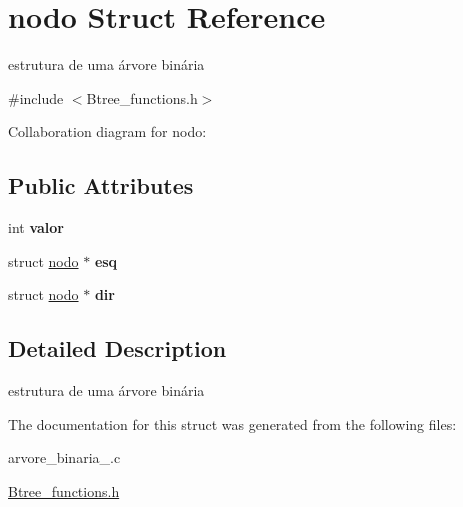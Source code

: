 \hypertarget{structnodo}{}\section{nodo Struct Reference}
\label{structnodo}


estrutura de uma árvore binária  




{\ttfamily \#include $<$Btree\+\_\+functions.\+h$>$}



Collaboration diagram for nodo\+:
\subsection*{Public Attributes}
\begin{DoxyCompactItemize}
\item 
\mbox{\label{structnodo_a40424c40ee6ffe6e5624f51ac42cbd20}} 
int {\bfseries valor}
\item 
\mbox{\label{structnodo_acd19927cd40acee84c58c2debeb234f8}} 
struct \hyperlink{structnodo}{nodo} $\ast$ {\bfseries esq}
\item 
\mbox{\label{structnodo_acb489ce2018caeddde0605244cffa200}} 
struct \hyperlink{structnodo}{nodo} $\ast$ {\bfseries dir}
\end{DoxyCompactItemize}


\subsection{Detailed Description}
estrutura de uma árvore binária 

The documentation for this struct was generated from the following files\+:\begin{DoxyCompactItemize}
\item 
arvore\+\_\+binaria\+\_.\+c\item 
\hyperlink{Btree__functions_8h}{Btree\+\_\+functions.\+h}\end{DoxyCompactItemize}
